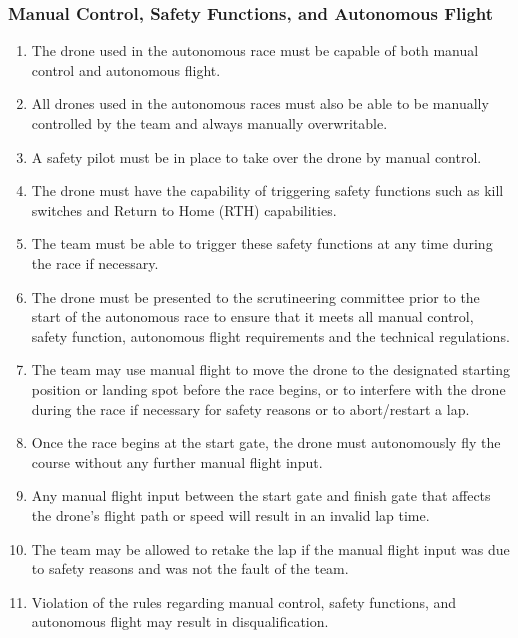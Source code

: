     \subsubsection{Manual Control, Safety Functions, and Autonomous Flight}
    \begin{enumerate}[resume]
    \item The drone used in the autonomous race must be capable of both manual control and autonomous flight.
    \item All drones used in the autonomous races must also be able to be manually controlled by the team and always manually overwritable.
    \item A safety pilot must be in place to take over the drone by manual control.
    \item The drone must have the capability of triggering safety functions such as kill switches and Return to Home (RTH) capabilities.
    \item The team must be able to trigger these safety functions at any time during the race if necessary.
    \item The drone must be presented to the scrutineering committee prior to the start of the autonomous race to ensure that it meets all manual control, safety function, autonomous flight requirements and the technical regulations.
    \item The team may use manual flight to move the drone to the designated starting position or landing spot before the race begins, or to interfere with the drone during the race if necessary for safety reasons or to abort/restart a lap.
    \item Once the race begins at the start gate, the drone must autonomously fly the course without any further manual flight input.
    \item Any manual flight input between the start gate and finish gate that affects the drone's flight path or speed will result in an invalid lap time.
    \item The team may be allowed to retake the lap if the manual flight input was due to safety reasons and was not the fault of the team.
    \item Violation of the rules regarding manual control, safety functions, and autonomous flight may result in disqualification.
    \end{enumerate}





